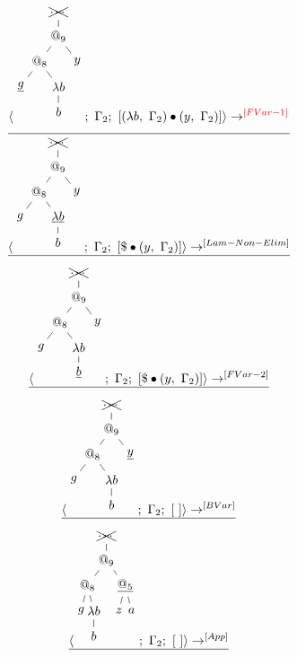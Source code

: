 \documentclass[a4paper, 10pt]{article}
\begin{document}
\begin{align*}
  \langle \begin{tikzpicture}[sibling distance=3em,level distance=2em]
    \node {\xcancel{$\dots$}}
    child { node {$@_9$}
      child { node {$@_8$}
        child { node {$\underline{g}$}}
        child { node {$\lambda b$}
          child { node {$b$}}}}
      child { node {$y$}}};
  \end{tikzpicture};\ \Gamma_2;\ [ (\lambda b,\ \Gamma_2) \bullet (y,\ \Gamma_2) ] \rangle &
  \rightarrow^{\color{red}[FVar-1]}\\
\end{align*}
\begin{align*}
  \hline
  \langle \begin{tikzpicture}[sibling distance=3em,level distance=2em]
    \node {\xcancel{$\dots$}}
    child { node {$@_9$}
      child { node {$@_8$}
        child { node {$g$}}
        child { node {$\underline{\lambda b}$}
          child { node {$b$}}}}
      child { node {$y$}}};
  \end{tikzpicture};\ \Gamma_2;\ [ \$ \bullet (y,\ \Gamma_2) ] \rangle & \rightarrow^{[Lam-Non-Elim]}\\
  \hline
\end{align*}
\begin{align*}
  \langle \begin{tikzpicture}[sibling distance=3em,level distance=2em]
    \node {\xcancel{$\dots$}}
    child { node {$@_9$}
      child { node {$@_8$}
        child { node {$g$}}
        child { node {$\lambda b$}
          child { node {$\underline{b}$}}}}
      child { node {$y$}}};
  \end{tikzpicture};\ \Gamma_2;\ [ \$ \bullet (y,\ \Gamma_2) ] \rangle & \rightarrow^{[FVar-2]}\\
  \hline
\end{align*}
\begin{align*}
  \langle \begin{tikzpicture}[sibling distance=3em,level distance=2em]
    \node {\xcancel{$\dots$}}
    child { node {$@_9$}
      child { node {$@_8$}
        child { node {$g$}}
        child { node {$\lambda b$}
          child { node {$b$}}}}
      child { node {$\underline{y}$}}};
  \end{tikzpicture};\ \Gamma_2;\ [\ ] \rangle & \rightarrow^{[BVar]}\\
  \hline
\end{align*}
\begin{align*}
  \langle \begin{tikzpicture}[sibling distance=3em,level distance=2em]
    \node {\xcancel{$\dots$}}
    child { node {$@_9$}
      child { node {$@_8$}[sibling distance=1em]
        child { node {$g$}}
        child { node {$\lambda b$}
          child { node {$b$}}}}
      child { node {$\underline{@_5}$}[sibling distance=1em]
        child { node {$z$}}
        child { node {$a$}}}};
  \end{tikzpicture};\ \Gamma_2;\ [\ ] \rangle & \rightarrow^{[App]}\\
  \hline
\end{align*}
\end{document}
